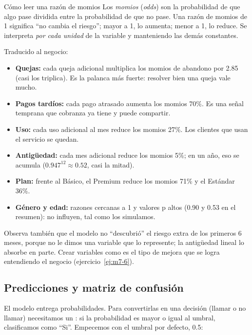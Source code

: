\begin{concepto}{Cómo leer una razón de momios}
Los \emph{momios} (\emph{odds}) son la probabilidad de que algo pase dividida
entre la probabilidad de que no pase. Una razón de momios de 1 significa ``no
cambia el riesgo''; mayor a 1, lo aumenta; menor a 1, lo reduce. Se interpreta
\emph{por cada unidad} de la variable y manteniendo las demás constantes.
\end{concepto}

Traducido al negocio:
\begin{itemize}
  \item \textbf{Quejas:} cada queja adicional multiplica los momios de
        abandono por 2.85 (casi los triplica). Es la palanca más fuerte:
        resolver bien una queja vale mucho.
  \item \textbf{Pagos tardíos:} cada pago atrasado aumenta los momios 70\%.
        Es una señal temprana que cobranza ya tiene y puede compartir.
  \item \textbf{Uso:} cada uso adicional al mes reduce los momios 27\%. Los
        clientes que usan el servicio se quedan.
  \item \textbf{Antigüedad:} cada mes adicional reduce los momios 5\%; en un
        año, eso se acumula ($0.947^{12} \approx 0.52$, casi la mitad).
  \item \textbf{Plan:} frente al Básico, el Premium reduce los momios 71\% y
        el Estándar 36\%.
  \item \textbf{Género y edad:} razones cercanas a 1 y valores p altos (0.90
        y 0.53 en el resumen): no influyen, tal como los simulamos.
\end{itemize}
Observa también que el modelo no ``descubrió'' el riesgo extra de los primeros
6 meses, porque no le dimos una variable que lo represente; la antigüedad
lineal lo absorbe en parte. Crear variables como
 es el tipo de mejora que se
logra entendiendo el negocio (ejercicio~\ref{ej:m7-6}).

\subsection{Predicciones y matriz de confusión}

El modelo entrega probabilidades. Para convertirlas en una decisión (llamar o
no llamar) necesitamos un : si la probabilidad es mayor o igual
al umbral, clasificamos como ``Si''. Empecemos con el umbral por defecto,
0.5:

